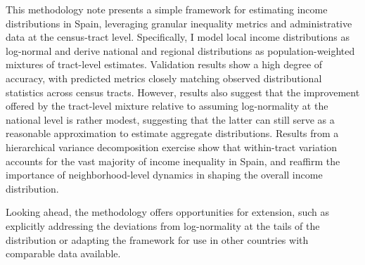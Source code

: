 \documentclass[letterpaper,11pt,leqno]{article}
\begin{document}
This methodology note presents a simple framework for estimating income distributions in Spain, leveraging granular inequality metrics and administrative data at the census-tract level. Specifically, I model local income distributions as log-normal and derive national and regional distributions as population-weighted mixtures of tract-level estimates. Validation results show a high degree of accuracy, with predicted metrics closely matching observed distributional statistics across census tracts. However, results also suggest that the improvement offered by the tract-level mixture relative to assuming log-normality at the national level is rather modest, suggesting that the latter can still serve as a reasonable approximation to estimate aggregate distributions. Results from a hierarchical variance decomposition exercise show that within-tract variation accounts for the vast majority of income inequality in Spain, and reaffirm the importance of neighborhood-level dynamics in shaping the overall income distribution.

Looking ahead, the methodology offers opportunities for extension, such as explicitly addressing the deviations from log-normality at the tails of the distribution or adapting the framework for use in other countries with comparable data available. 

\newpage
\singlespacing


\end{document}
